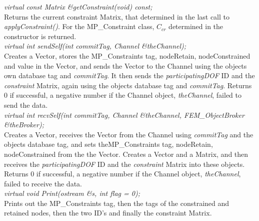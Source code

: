 {\em virtual const Matrix \&getConstraint(void) const;} \\
Returns the current constraint Matrix, that determined in the last
call to {\em applyConstraint()}. For the MP\_Constraint class, $C_{cr}$
determined in the constructor is returned. \\

{\em virtual int sendSelf(int commitTag, Channel \&theChannel);} \\
Creates a Vector, stores the MP\_Constraints tag, nodeRetain,
nodeConstrained and value in the Vector, and sends the Vector to the
Channel using the objects own database tag and {\em commitTag}. It then
sends the {\em participatingDOF} ID and the {\em constraint}
Matrix, again using the objects database tag and {\em
commitTag}. Returns $0$ if successful, a negative number if the
Channel object, {\em theChannel}, failed to send the data. \\ 

{\em virtual int recvSelf(int commitTag, Channel \&theChannel,
FEM\_ObjectBroker \&theBroker);} \\ 
Creates a Vector, receives the Vector from the Channel using {\em
commitTag} and the objects database tag, and sets theMP\_Constraints
tag, nodeRetain, nodeConstrained from the the Vector. Creates a
Vector and a Matrix, and then receives the {\em participatingDOF} ID
and the {\em constraint} Matrix into these objects. Returns $0$ if
successful, a negative number if the Channel object, {\em
theChannel}, failed to receive the data.\\ 

{\em virtual void Print(ostream \&s, int flag = 0);} \\
Prints out the MP\_Constraints tag, then the tags of the constrained
and retained nodes, then the two ID's and finally the constraint Matrix.\\






